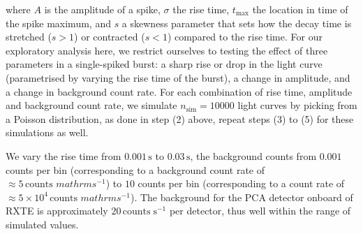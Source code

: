 \documentclass[numberedappendix]{emulateapj}
\begin{document}
where $A$ is the amplitude of a spike, $\sigma$ the rise time, $t_\mathrm{max}$ the location in time of the spike maximum, and $s$ a skewness parameter that sets how the decay time is stretched ($s > 1$) or contracted ($s < 1$) compared to the rise time. 
For our exploratory analysis here, we restrict ourselves to testing the effect of three parameters in a single-spiked burst: a sharp rise or drop in the light curve (parametrised by varying the rise time of the burst), a change in amplitude, and a change in background count rate. For each combination of rise time, amplitude and background count rate, we simulate $n_{\mathrm{sim}} = 10000$  light curves by picking from a Poisson distribution, as done in step (2) above, repeat steps (3) to (5) for these simulations as well. 

We vary the rise time from $0.001 \, \mathrm{s}$ to $0.03 \, \mathrm{s}$, the background counts from $0.001$ counts per bin (corresponding to a background count rate of $\approx 5 \, \mathrm{counts}\, \,mathrm{s}^{-1}$) to $10$ counts per bin (corresponding to a count rate of $\approx 5 \times 10^{4}\, \mathrm{counts}\, \,mathrm{s}^{-1}$). The background for the PCA detector onboard of RXTE is approximately $20\, \mathrm{counts}\; \mathrm{s}^{-1}$ per detector, thus well within the range of simulated values.
\end{document}
